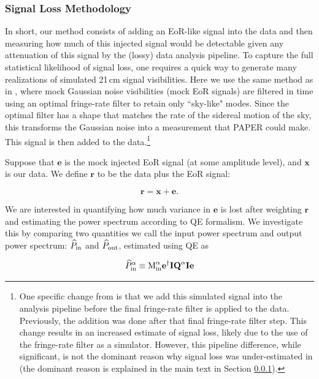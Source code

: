 \documentclass[preprint2,numberedappendix,tighten]{aastex6}  %
\begin{document}
\subsubsection{Signal Loss Methodology} 
\label{sec:siglossmethod}
In short, our method consists of adding an EoR-like signal into the data and then measuring how much of this injected signal would be detectable given any attenuation of this signal by the (lossy) data analysis pipeline.  To capture the full statistical likelihood of signal loss, one requires a quick way to generate many realizations of simulated 21\,cm signal visibilities. Here we use the same method as in , where mock Gaussian noise visibilities (mock EoR signals) 
are filtered in time using an optimal fringe-rate filter to retain only ``sky-like" modes. Since the optimal filter has a shape that matches the rate of the sidereal motion of the sky, this transforms the Gaussian noise into a measurement that PAPER could make. This signal is then added to the data.\footnote{One 
specific change from  is that we add this simulated signal into the analysis pipeline before the final fringe-rate filter is 
applied to the data. Previously, the addition was done after that final fringe-rate filter step.  This change results in an increased 
estimate of signal loss, %
likely due to the use of the fringe-rate filter as a simulator. However, this pipeline difference, while significant, is not the dominant reason why signal loss was under-estimated in  (the dominant reason is explained in the main text in Section \ref{sec:siglossmethod}).}

Suppose that $\textbf{e}$ is the mock injected EoR signal (at some amplitude level), and $\textbf{x}$ is our data. We define $\textbf{r}
$ to be the data plus the EoR signal:

\begin{equation}
\label{eq:rxe}
\textbf{r} = \textbf{x} + \textbf{e}.
\end{equation}

We are interested in quantifying how much variance in $\textbf{e}$ is lost after weighting $\textbf{r}$ and estimating the power 
spectrum according to QE formalism. We investigate this by comparing two quantities we call the input power spectrum and 
output power spectrum: $\widehat{P}_{\rm in}$ and $\widehat{P}_{\rm out}$, estimated using QE as

\begin{equation}
\label{eq:Pin}
\widehat{P}_{\rm in}^{\alpha} \equiv \text{M}^{\alpha}_{\rm in}\textbf{e}^{\dagger}\textbf{I}\textbf{Q}^{\alpha}\textbf{I}\textbf{e}
\end{equation}
\end{document}
